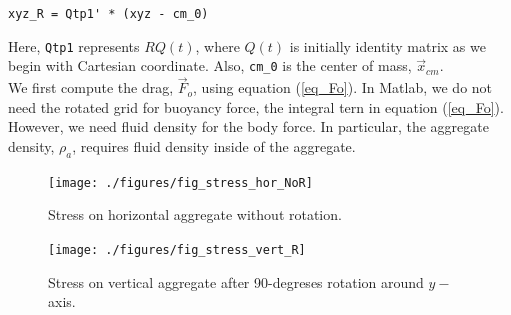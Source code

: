 \begin{framed}
	\verb+xyz_R = Qtp1' * (xyz - cm_0)+
\end{framed}
\noindent
Here, \verb+Qtp1+ represents $R Q(t)$, where $Q(t)$ is initially identity matrix as we begin with Cartesian coordinate. Also, \verb+cm_0+ is the center of mass, $\vec{x}_{cm}.$
\\
We first compute the drag, $\vec{F}_o$, using equation (\ref{eq_Fo}). In Matlab, we do not need the rotated grid for buoyancy force, the integral tern in equation (\ref{eq_Fo}). However, we need fluid density for the body force. In particular, the aggregate density, $\rho_a$, requires fluid density inside of the aggregate. 
\clearpage
    \begin{figure}
    	\begin{center}
			\texttt{[image: ./figures/fig\_stress\_hor\_NoR]}
    	\caption{Stress on horizontal aggregate without rotation.}
    	\label{fig_stress_hor_NoR}
    \end{center}
    \end{figure}
    \begin{figure}
    	\begin{center}
			\texttt{[image: ./figures/fig\_stress\_vert\_R]}
    	\caption{Stress on vertical aggregate after 90-degreses rotation around $y-$ axis.}
    	\label{fig_stress_vert_R}
    \end{center}
    \end{figure}

\clearpage
